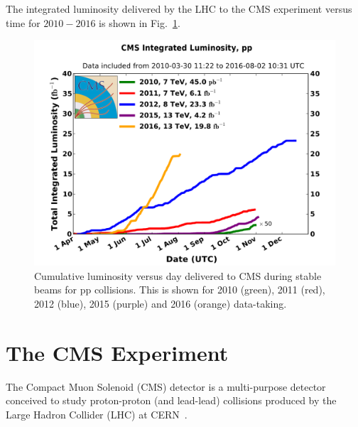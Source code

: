 The integrated luminosity delivered by the LHC to the CMS experiment
versus time for $2010-2016$ is shown in Fig.~\ref{fig:IntLumi20102016}.

\begin{figure}\centering
\includegraphics[width=.9\textwidth]{figs/cms/int_lumi_cumulative_pp_2.pdf}
\caption{Cumulative luminosity versus day delivered to CMS during
  stable beams for pp collisions. This is shown for 2010 (green), 2011
  (red), 2012 (blue), 2015 (purple) and 2016 (orange)
  data-taking.\label{fig:IntLumi20102016}}
\end{figure}


\chapter{The CMS Experiment}
\label{ch:cms}
The Compact Muon Solenoid (CMS) detector is a multi-purpose detector
conceived to study proton-proton (and lead-lead) collisions produced
by the Large Hadron Collider (LHC) at CERN~\cite{Adolphi:2008zzk}.

